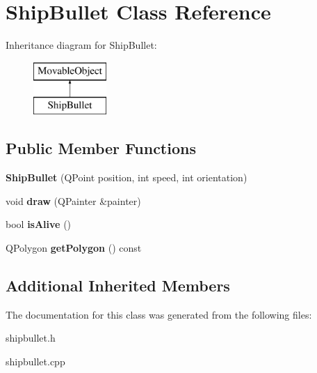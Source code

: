 \hypertarget{classShipBullet}{\section{Ship\-Bullet Class Reference}
\label{classShipBullet}
}
Inheritance diagram for Ship\-Bullet\-:\begin{figure}[H]
\begin{center}
\leavevmode
\includegraphics[height=2.000000cm]{classShipBullet}
\end{center}
\end{figure}
\subsection*{Public Member Functions}
\begin{DoxyCompactItemize}
\item 
\hypertarget{classShipBullet_a5b6665ee24ceeb4b7410786581ef885f}{{\bfseries Ship\-Bullet} (Q\-Point position, int speed, int orientation)}\label{classShipBullet_a5b6665ee24ceeb4b7410786581ef885f}

\item 
\hypertarget{classShipBullet_afb06f07a413c735cb69a1f16756d89a4}{void {\bfseries draw} (Q\-Painter \&painter)}\label{classShipBullet_afb06f07a413c735cb69a1f16756d89a4}

\item 
\hypertarget{classShipBullet_a5bf79549af9ec712e03c981cfc85bacf}{bool {\bfseries is\-Alive} ()}\label{classShipBullet_a5bf79549af9ec712e03c981cfc85bacf}

\item 
\hypertarget{classShipBullet_afe540907a92b8a833774b5ff78b71b9e}{Q\-Polygon {\bfseries get\-Polygon} () const }\label{classShipBullet_afe540907a92b8a833774b5ff78b71b9e}

\end{DoxyCompactItemize}
\subsection*{Additional Inherited Members}


The documentation for this class was generated from the following files\-:\begin{DoxyCompactItemize}
\item 
shipbullet.\-h\item 
shipbullet.\-cpp\end{DoxyCompactItemize}
